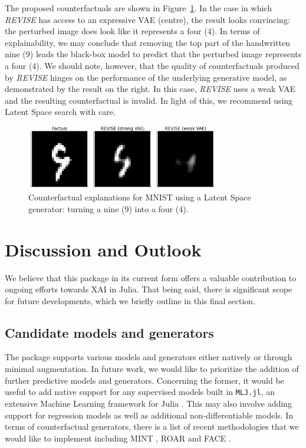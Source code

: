 \documentclass[
  letterpaper,
  DIV=11,
  numbers=noendperiod]{scrartcl}
\begin{document}
The proposed counterfactuals are shown in Figure~\ref{fig-mnist}. In the
case in which \emph{REVISE} has access to an expressive VAE (centre),
the result looks convincing: the perturbed image does look like it
represents a four (4). In terms of explainability, we may conclude that
removing the top part of the handwritten nine (9) leads the black-box
model to predict that the perturbed image represents a four (4). We
should note, however, that the quality of counterfactuals produced by
\emph{REVISE} hinges on the performance of the underlying generative
model, as demonstrated by the result on the right. In this case,
\emph{REVISE} uses a weak VAE and the resulting counterfactual is
invalid. In light of this, we recommend using Latent Space search with
care.

\begin{figure}

{\centering \includegraphics[width=3.33333in,height=1.11111in]{www/mnist_9to4_latent.png}

}

\caption{\label{fig-mnist}Counterfactual explanations for MNIST using a
Latent Space generator: turning a nine (9) into a four (4).}

\end{figure}

\hypertarget{sec-outlook}{%
\section{Discussion and Outlook}\label{sec-outlook}}

We believe that this package in its current form offers a valuable
contribution to ongoing efforts towards XAI in Julia. That being said,
there is significant scope for future developments, which we briefly
outline in this final section.

\hypertarget{candidate-models-and-generators}{%
\subsection{Candidate models and
generators}\label{candidate-models-and-generators}}

The package supports various models and generators either natively or
through minimal augmentation. In future work, we would like to
prioritize the addition of further predictive models and generators.
Concerning the former, it would be useful to add native support for any
supervised models built in \texttt{MLJ.jl}, an extensive Machine
Learning framework for Julia \cite{blaom2020mlj}. This may also involve
adding support for regression models as well as additional
non-differentiable models. In terms of counterfactual generators, there
is a list of recent methodologies that we would like to implement
including MINT \cite{karimi2021algorithmic}, ROAR
\cite{upadhyay2021robust} and FACE \cite{poyiadzi2020face}.
\end{document}
